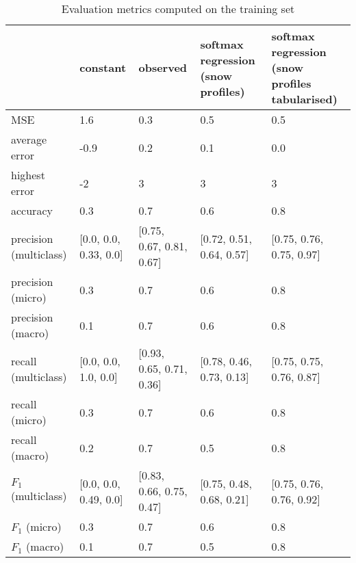 \begin{table}[H]
\caption{Evaluation metrics computed on the training set}
\label{tbl:sais_eval_training}
\begin{tabular}{lllll}
\toprule
 & constant & observed & softmax regression (snow profiles) & softmax regression (snow profiles tabularised) \\
\midrule
MSE & 1.6 & 0.3 & 0.5 & 0.5 \\
average error & -0.9 & 0.2 & 0.1 & 0.0 \\
highest error & -2 & 3 & 3 & 3 \\
accuracy & 0.3 & 0.7 & 0.6 & 0.8 \\
precision (multiclass) & [0.0, 0.0, 0.33, 0.0] & [0.75, 0.67, 0.81, 0.67] & [0.72, 0.51, 0.64, 0.57] & [0.75, 0.76, 0.75, 0.97] \\
precision (micro) & 0.3 & 0.7 & 0.6 & 0.8 \\
precision (macro) & 0.1 & 0.7 & 0.6 & 0.8 \\
recall (multiclass) & [0.0, 0.0, 1.0, 0.0] & [0.93, 0.65, 0.71, 0.36] & [0.78, 0.46, 0.73, 0.13] & [0.75, 0.75, 0.76, 0.87] \\
recall (micro) & 0.3 & 0.7 & 0.6 & 0.8 \\
recall (macro) & 0.2 & 0.7 & 0.5 & 0.8 \\
$F_1$ (multiclass) & [0.0, 0.0, 0.49, 0.0] & [0.83, 0.66, 0.75, 0.47] & [0.75, 0.48, 0.68, 0.21] & [0.75, 0.76, 0.76, 0.92] \\
$F_1$ (micro) & 0.3 & 0.7 & 0.6 & 0.8 \\
$F_1$ (macro) & 0.1 & 0.7 & 0.5 & 0.8 \\
\bottomrule
\end{tabular}
\end{table}
